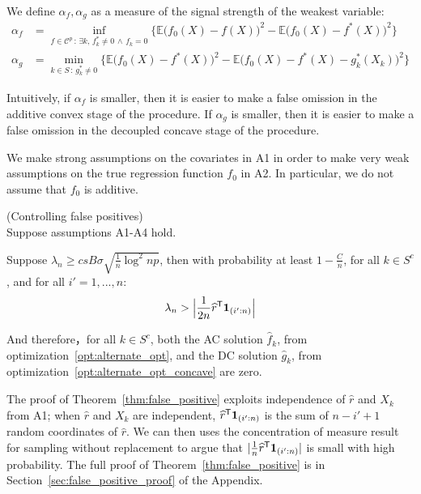 We define $\alpha_f, \alpha_g$ as a measure of the signal strength of the weakest variable:
\begin{align*}
\alpha_f &= \inf_{f \in \mathcal{C}^p \,:\, \exists k ,\, f^*_k \neq 0 \,\wedge\, f_k = 0} 
       \Big\{ \mathbb{E} \big( f_0(X) - f(X) \big)^2 - 
        \mathbb{E} \big( f_0(X) - f^*(X) \big)^2  \Big\}\\
\alpha_g &=   \min_{k \in S \,:\, g^*_k \neq 0}
      \Big\{ \mathbb{E} \big( f_0(X) - f^*(X) \big)^2 - 
    \mathbb{E} \big( f_0(X) - f^*(X) - g^*_k(X_k) \big)^2 \Big\}
\end{align*}

Intuitively, if $\alpha_f$ is smaller, then it is easier to make a false omission in the additive convex stage of the procedure. If $\alpha_g$ is smaller, then it is easier to make a false omission in the decoupled concave stage of the procedure.

\begin{remark}
  We make strong assumptions on the covariates in A1 in order to make
  very weak assumptions on the true regression function $f_0$ in
  A2. In particular, we do not assume that $f_0$ is additive. 
\end{remark}


\begin{theorem} (Controlling false positives) \\
\label{thm:false_positive}
Suppose assumptions A1-A4 hold. 

Suppose $\lambda_n \geq c s B \sigma  \sqrt{ \frac{1}{n} \log^2 np}$, then with probability at least $ 1 - \frac{C}{n}$, for all $k \in S^c$, and for all $i'=1,...,n$:
\[
\lambda_n > \Big| \frac{1}{2n}\widehat{r}^{\mathsf{T}} \mbox{\boldmath $1$}_{(i':n)} \Big|
\]

And therefore，for all $k \in S^c$, both the AC solution $\hat{f}_k$, from optimization~\ref{opt:alternate_opt}, and the DC solution $\hat{g}_k$, from optimization~\ref{opt:alternate_opt_concave} are zero. \\
\end{theorem}

The proof of Theorem~\ref{thm:false_positive} exploits independence of
$\hat{r}$ and $X_k$ from A1; when $\hat{r}$ and $X_k$ are independent, $\widehat{r}^{\mathsf{T}} \mbox{\boldmath $1$}_{(i':n)}$ is the sum of $n - i' +1$ random coordinates of $\hat{r}$.  We can then uses the concentration of measure result for sampling without replacement to argue that $| \frac{1}{n} \widehat{r}^{\mathsf{T}}\mbox{\boldmath $1$}_{(i':n)}|$ is small with high probability. The full proof of
Theorem~\ref{thm:false_positive} is in
Section~\ref{sec:false_positive_proof} of the Appendix.

